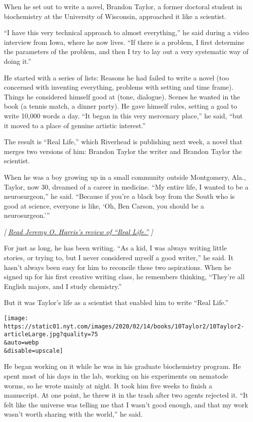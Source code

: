 When he set out to write a novel, Brandon Taylor, a former doctoral
student in biochemistry at the University of Wisconsin, approached it
like a scientist.

``I have this very technical approach to almost everything,'' he said
during a video interview from Iowa, where he now lives. ``If there is a
problem, I first determine the parameters of the problem, and then I try
to lay out a very systematic way of doing it.''

He started with a series of lists: Reasons he had failed to write a
novel (too concerned with inventing everything, problems with setting
and time frame). Things he considered himself good at (tone, dialogue).
Scenes he wanted in the book (a tennis match, a dinner party). He gave
himself rules, setting a goal to write 10,000 words a day. ``It began in
this very mercenary place,'' he said, ``but it moved to a place of
genuine artistic interest.''

The result is ``Real Life,'' which Riverhead is publishing next week, a
novel that merges two versions of him: Brandon Taylor the writer and
Brandon Taylor the scientist.

When he was a boy growing up in a small community outside Montgomery,
Ala., Taylor, now 30, dreamed of a career in medicine. ``My entire life,
I wanted to be a neurosurgeon,'' he said. ``Because if you're a black
boy from the South who is good at science, everyone is like, `Oh, Ben
Carson, you should be a neurosurgeon.'''

\emph{{[}}
\href{https://www.nytimes.com/2020/02/18/books/review/brandon-taylor-real-life.html}{\emph{Read
Jeremy O. Harris's review of ``Real Life.''}} \emph{{]}}

For just as long, he has been writing. ``As a kid, I was always writing
little stories, or trying to, but I never considered myself a good
writer,'' he said. It hasn't always been easy for him to reconcile these
two aspirations. When he signed up for his first creative writing class,
he remembers thinking, ``They're all English majors, and I study
chemistry.''

But it was Taylor's life as a scientist that enabled him to write ``Real
Life.''

\texttt{[image: https://static01.nyt.com/images/2020/02/14/books/10Taylor2/10Taylor2-articleLarge.jpg?quality=75\\\&auto=webp\\\&disable=upscale]}

He began working on it while he was in his graduate biochemistry
program. He spent most of his days in the lab, working on his
experiments on nematode worms, so he wrote mainly at night. It took him
five weeks to finish a manuscript. At one point, he threw it in the
trash after two agents rejected it. ``It felt like the universe was
telling me that I wasn't good enough, and that my work wasn't worth
sharing with the world,'' he said.

